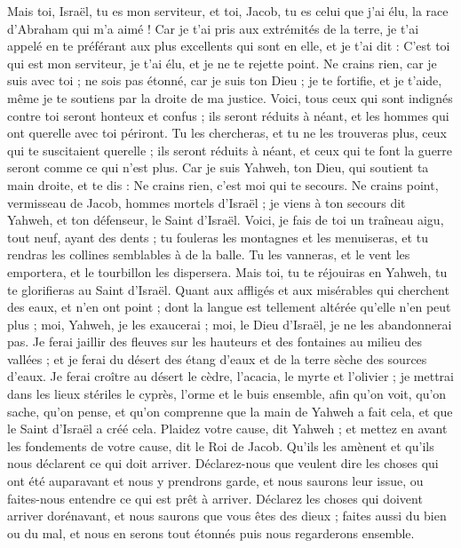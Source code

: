 \begin{multicols}{2}
Mais toi, Israël, tu es mon serviteur, et toi, Jacob, tu es celui que j'ai élu, la race d'Abraham qui m'a aimé !
Car je t'ai pris aux extrémités de la terre, je t'ai appelé en te préférant aux plus excellents qui sont en elle, et je t'ai dit : C'est toi qui est mon serviteur, je t'ai élu, et je ne te rejette point.
Ne crains rien, car je suis avec toi ; ne sois pas étonné, car je suis ton Dieu ; je te fortifie, et je t'aide, même je te soutiens par la droite de ma justice.
Voici, tous ceux qui sont indignés contre toi seront honteux et confus ; ils seront réduits à néant, et les hommes qui ont querelle avec toi périront.
Tu les chercheras, et tu ne les trouveras plus, ceux qui te suscitaient querelle ; ils seront réduits à néant, et ceux qui te font la guerre seront comme ce qui n'est plus.
Car je suis Yahweh, ton Dieu, qui soutient ta main droite, et te dis : Ne crains rien, c'est moi qui te secours.
Ne crains point, vermisseau de Jacob, hommes mortels d'Israël ; je viens à ton secours dit Yahweh, et ton défenseur, le Saint d'Israël.
Voici, je fais de toi un traîneau aigu, tout neuf, ayant des dents ; tu fouleras les montagnes et les menuiseras, et tu rendras les collines semblables à de la balle.
Tu les vanneras, et le vent les emportera, et le tourbillon les dispersera. Mais toi, tu te réjouiras en Yahweh, tu te glorifieras au Saint d'Israël.
Quant aux affligés et aux misérables qui cherchent des eaux, et n'en ont point ; dont la langue est tellement altérée qu'elle n'en peut plus ; moi, Yahweh, je les exaucerai ; moi, le Dieu d'Israël, je ne les abandonnerai pas.
Je ferai jaillir des fleuves sur les hauteurs et des fontaines au milieu des vallées ; et je ferai du désert des étang d'eaux et de la terre sèche des sources d'eaux.
Je ferai croître au désert le cèdre, l'acacia, le myrte et l'olivier ; je mettrai dans les lieux stériles le cyprès, l'orme et le buis ensemble,
afin qu'on voit, qu'on sache, qu'on pense, et qu'on comprenne que la main de Yahweh a fait cela, et que le Saint d'Israël a créé cela.
Plaidez votre cause, dit Yahweh ; et mettez en avant les fondements de votre cause, dit le Roi de Jacob.
Qu'ils les amènent et qu'ils nous déclarent ce qui doit arriver. Déclarez-nous que veulent dire les choses qui ont été auparavant et nous y prendrons garde, et nous saurons leur issue, ou faites-nous entendre ce qui est prêt à arriver. 
Déclarez les choses qui doivent arriver dorénavant, et nous saurons que vous êtes des dieux ; faites aussi du bien ou du mal, et nous en serons tout étonnés puis nous regarderons ensemble.

\end{multicols}
